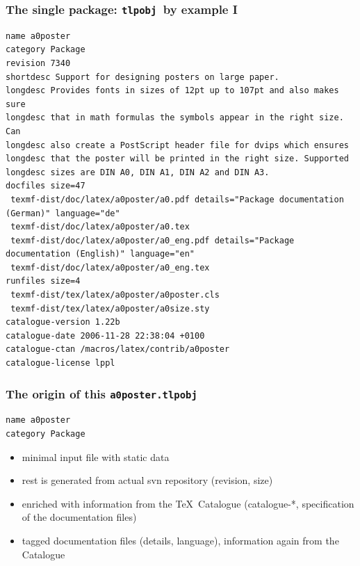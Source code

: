 \documentclass{beamer}
\newcommand{\tlpobj}{\texttt{tlpobj}}
\begin{document}
\begin{frame}
  \frametitle{The single package: \tlpobj\ by example I}
  \begin{lstlisting}[basicstyle=\ttfamily\tiny,title={a0poster.tlpobj},label=a0poster]
name a0poster
category Package
revision 7340
shortdesc Support for designing posters on large paper.
longdesc Provides fonts in sizes of 12pt up to 107pt and also makes sure
longdesc that in math formulas the symbols appear in the right size. Can
longdesc also create a PostScript header file for dvips which ensures
longdesc that the poster will be printed in the right size. Supported
longdesc sizes are DIN A0, DIN A1, DIN A2 and DIN A3.
docfiles size=47
 texmf-dist/doc/latex/a0poster/a0.pdf details="Package documentation (German)" language="de"
 texmf-dist/doc/latex/a0poster/a0.tex
 texmf-dist/doc/latex/a0poster/a0_eng.pdf details="Package documentation (English)" language="en"
 texmf-dist/doc/latex/a0poster/a0_eng.tex
runfiles size=4
 texmf-dist/tex/latex/a0poster/a0poster.cls
 texmf-dist/tex/latex/a0poster/a0size.sty
catalogue-version 1.22b
catalogue-date 2006-11-28 22:38:04 +0100
catalogue-ctan /macros/latex/contrib/a0poster
catalogue-license lppl
\end{lstlisting}
\end{frame}

\begin{frame}[fragile]
  \frametitle{The origin of this \texttt{a0poster.tlpobj}}
  \begin{lstlisting}[basicstyle=\ttfamily\small,title={a0poster.tlpsrc},label=a0poster.tlpsrc]
name a0poster
category Package
\end{lstlisting}
  \begin{itemize}
  \item minimal input file with static data
  \item rest is generated from actual svn repository (revision, size)
  \item enriched with information from the \TeX\ Catalogue
    (catalogue-*, specification of the documentation files)
  \item tagged documentation files (details, language), information
    again from the Catalogue
  \end{itemize}
\end{frame}
\end{document}
